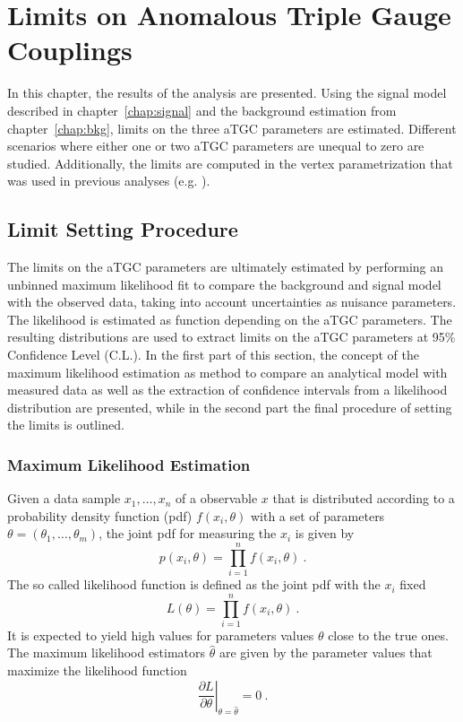 \chapter{Limits on Anomalous Triple Gauge Couplings}
\label{chap:LimitsonATGCs}

In this chapter, the results of the analysis are presented. Using the signal model described in chapter~\ref{chap:signal} and the background estimation from chapter~\ref{chap:bkg}, limits on the three aTGC parameters are estimated. Different scenarios where either one or two aTGC parameters are unequal to zero are studied. Additionally, the limits are computed in the vertex parametrization that was used in previous analyses (e.g. \cite{aTGC1,aTGC2}).

\section{Limit Setting Procedure}
The limits on the aTGC parameters are ultimately estimated by performing an unbinned maximum likelihood fit to compare the background and signal model with the observed data, taking into account uncertainties as nuisance parameters. The likelihood is estimated as function depending on the aTGC parameters. The resulting distributions are used to extract limits on the aTGC parameters at 95\% Confidence Level (C.L.). In the first part of this section, the concept of the maximum likelihood estimation as method to compare an analytical model with measured data as well as the extraction of confidence intervals from a likelihood distribution are presented, while in the second part the final procedure of setting the limits is outlined.
\subsection{Maximum Likelihood Estimation}
\label{subsec:maxlikeest}
Given a data sample $x_1,\dots,x_n$ of a observable $x$ that is distributed according to a probability density function (pdf) $f(x_i,\theta)$ with a set of parameters $\theta=(\theta_1,\dots,\theta_m)$, the joint pdf for measuring the $x_i$ is given by \cite{cowan}
\begin{equation}
p(x_i,\theta) = \prod_{i=1}^n f(x_i,\theta) ~.
\end{equation}
The so called likelihood function is defined as the joint pdf with the $x_i$ fixed
\begin{equation}
L(\theta) = \prod_{i=1}^n f(x_i,\theta) ~.
\end{equation}
It is expected to yield high values for parameters values $\theta$ close to the true ones. The maximum likelihood estimators $\hat{\theta}$ are given by the parameter values that maximize the likelihood function
\begin{equation}
\left. \frac{\partial L}{\partial \theta} \right| _{\theta=\hat{\theta}} = 0 ~.
\label{eq:limits:1stderivlikelihood}
\end{equation}

